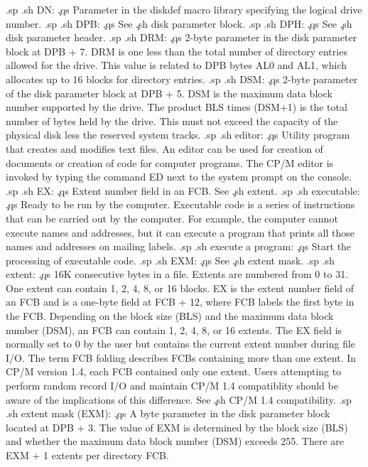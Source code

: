 .sp
.sh
DN:  \c
.qs
Parameter in the diskdef macro library specifying the logical 
drive number.
.sp
.sh
DPB:  \c
.qs
See \c
.sh
disk parameter block.
.sp
.sh
DPH:  \c
.qs
See \c
.sh
disk parameter header.
.sp
.sh
DRM:  \c
.qs
2-byte parameter in the disk parameter block at DPB + 7.  DRM is 
one less than the total number of directory entries allowed for 
the drive.  This value is related to DPB bytes AL0 and AL1, which 
allocates up to 16 blocks for directory entries.
.sp
.sh
DSM:  \c
.qs
2-byte parameter of the disk parameter block at DPB + 5.  DSM is 
the maximum data block number supported by the drive.  The 
product BLS times (DSM+1) is the total number of bytes held by 
the drive.  This must not exceed the capacity of the physical 
disk less the reserved system tracks.
.sp
.sh
editor:  \c
.qs
Utility program that creates and modifies text files.  An editor 
can be used for creation of documents or creation of code for 
computer programs.  The CP/M editor is invoked by typing the 
command ED next to the system prompt on the console.
.sp
.sh
EX:  \c
.qs
Extent number field in an FCB.  See \c
.sh
extent.
.sp
.sh
executable:  \c
.qs
Ready to be run by the computer.  Executable code is a series of 
instructions that can be carried out by the computer.  For 
example, the computer cannot execute names and addresses, but it 
can execute a program that prints all those names and addresses 
on mailing labels.
.sp
.sh
execute a program:  \c
.qs
Start the processing of executable code.
.sp
.sh
EXM:  \c
.qs
See \c
.sh
extent mask.
.sp
.sh
extent:  \c
.qs
16K consecutive bytes in a file.  Extents are numbered from 0 to 
31.  One extent can contain 1, 2, 4, 8, or 16 blocks.  EX is the 
extent number field of an FCB and is a one-byte field at FCB + 
12, where FCB labels the first byte in the FCB.  Depending on the 
block size (BLS) and the maximum data block number (DSM), an FCB 
can contain 1, 2, 4, 8, or 16 extents.  The EX field is normally 
set to 0 by the user but contains the current extent number 
during file I/O.  The term FCB folding describes FCBs containing 
more than one extent.  In CP/M version 1.4, each FCB contained 
only one extent.  Users attempting to perform random record I/O 
and maintain CP/M 1.4 compatiblity should be aware of the 
implications of this difference.  See \c
.sh
CP/M 1.4 compatibility.
.sp
.sh
extent mask (EXM):  \c
.qs
A byte parameter in the disk parameter block located at DPB + 3.  
The value of EXM is determined by the block size (BLS) and 
whether the maximum data block number (DSM) exceeds 255.  There 
are EXM + 1 extents per directory FCB.
